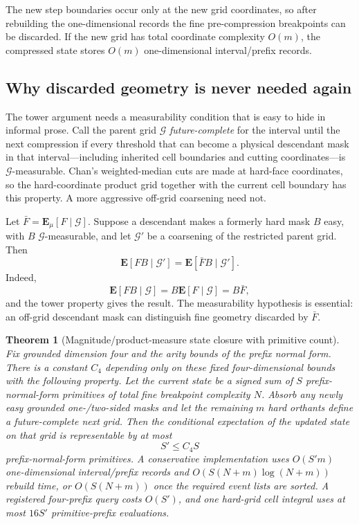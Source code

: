 \documentclass[12pt,a4paper]{article}
\newtheorem{theorem}{Theorem}
\theoremstyle{definition}
\newcommand{\E}{\mathbf E}
\newcommand{\1}{\mathbf 1}
\begin{document}
The new step boundaries occur only at the new grid coordinates, so after rebuilding the one-dimensional records the fine pre-compression breakpoints can be discarded. If the new grid has total coordinate complexity $O(m)$, the compressed state stores $O(m)$ one-dimensional interval/prefix records.

\subsection{Why discarded geometry is never needed again}

The tower argument needs a measurability condition that is easy to hide in informal prose.  Call the parent grid $\mathcal G$ \emph{future-complete} for the interval until the next compression if every threshold that can become a physical descendant mask in that interval---including inherited cell boundaries and cutting coordinates---is $\mathcal G$-measurable.  Chan's weighted-median cuts are made at hard-face coordinates, so the hard-coordinate product grid together with the current cell boundary has this property.  A more aggressive off-grid coarsening need not.

Let $\bar F=\E_\mu[F\mid\mathcal G]$.  Suppose a descendant makes a formerly hard mask $B$ easy, with $B$ $\mathcal G$-measurable, and let $\mathcal G'$ be a coarsening of the restricted parent grid.  Then
\begin{equation}
\boxed{
\E[F B\mid\mathcal G']
 =\E[\bar F B\mid\mathcal G'].}                               \label{eq:tower}
\end{equation}
Indeed,
\[
\E[FB\mid\mathcal G]=B\E[F\mid\mathcal G]=B\bar F,
\]
and the tower property gives the result.  The measurability hypothesis is essential: an off-grid descendant mask can distinguish fine geometry discarded by $\bar F$.

\begin{theorem}[Magnitude/product-measure state closure with primitive count] \label{thm:closure}
Fix grounded dimension four and the arity bounds of the prefix normal form.  There is a constant $C_4$ depending only on these fixed four-dimensional bounds with the following property.  Let the current state be a signed sum of $S$ prefix-normal-form primitives of total fine breakpoint complexity $N$.  Absorb any newly easy grounded one-/two-sided masks and let the remaining $m$ hard orthants define a future-complete next grid.  Then the conditional expectation of the updated state on that grid is representable by at most
\[
\boxed{S'\le C_4S}
\]
prefix-normal-form primitives.  A conservative implementation uses $O(S'm)$ one-dimensional interval/prefix records and $O(S(N+m)\log(N+m))$ rebuild time, or $O(S(N+m))$ once the required event lists are sorted.  A registered four-prefix query costs $O(S')$, and one hard-grid cell integral uses at most $16S'$ primitive-prefix evaluations.
\end{theorem}
\end{document}
